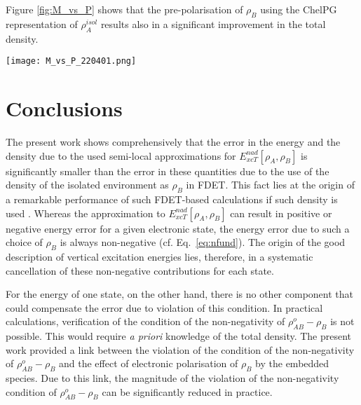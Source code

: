 \documentclass[amsmath,amssymb,preprint,aip,jcp]{revtex4-1}
\newcommand{\nr}[1]{\color{red}#1\color{black}}
\begin{document}
Figure \ref{fig:M_vs_P} shows that the pre-polarisation of $\rho_B$ using the  ChelPG representation of $\rho_A^{isol}$
results also \nr{in } a significant improvement in the total density.

\begin{figure*}
\centering
\texttt{[image: M\_vs\_P\_220401.png]}
\caption{Integrated negative density $M$ and the total density error $P$ for various choices of $\rho_B$:  a) $\rho_B^{isol}$ (orange triangles), b) $\rho_B^{FAT}$ (light blue hexagons), c) $\rho_B^{pp(Mulliken)}$ (green diamonds), and d) $\rho_B^{pp(ChelPG)}$ (dark blue pentagons). Data obtained using the {\it monomer expansion}.}
\label{fig:M_vs_P}
\end{figure*}


\section{Conclusions}

The present work shows comprehensively that the error in the energy and the density due to the used semi-local approximations for 
${E}_{xcT}^{nad}[\rho_A,\rho_B]$ is significantly  smaller than the error in these quantities due to  the use of the density of the isolated environment as $\rho_B$ in FDET.
This fact lies at the origin of  a  remarkable performance of such FDET\nr{-}based calculations if such density is used  \cite{Ricardi2018}.
Whereas  the approximation  to ${E}_{xcT}^{nad}[\rho_A,\rho_B]$ can result in \nr{positive or negative energy error for } a given electronic state, the \nr{energy error due to  such a choice of $\rho_B$ } is always non-negative (cf. Eq.~\ref{eq:nfund}). The origin of the good description of vertical excitation energies lies, therefore, in a systematic cancellation of these non-negative contributions for each state.

For the energy of one state, on the other hand, there is no other component that could compensate \nr{the } error due to violation of this condition. In practical calculations, verification  of the condition of the non-negativity of $\rho^{o}_{AB}-\rho_B$ is not possible. This would require \textit{a priori} knowledge of the total density.
The present work provided a link between the violation of the condition of the non-negativity of $\rho^{o}_{AB}-\rho_B$
and the effect of electronic polarisation of $\rho_B$ by the embedded species. Due to this link, the magnitude
of the violation of the non-negativity condition of $\rho^{o}_{AB}-\rho_B$ can be significantly reduced  in practice.
\end{document}
